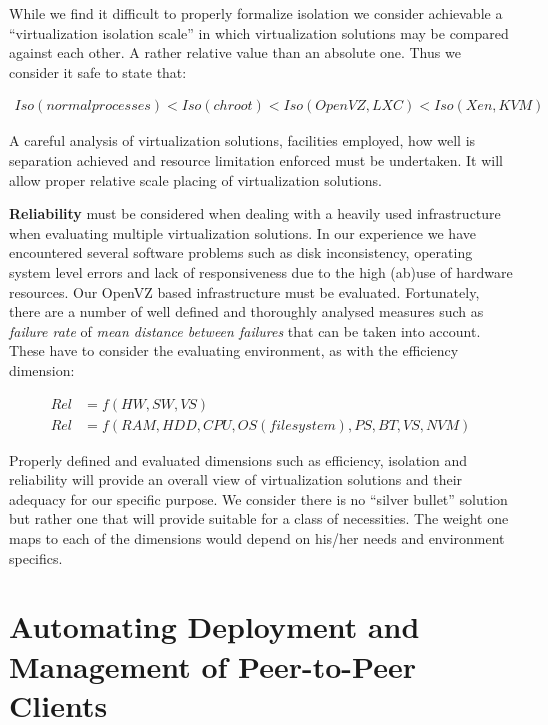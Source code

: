 While we find it difficult to properly formalize isolation we consider
achievable a ``virtualization isolation scale'' in which virtualization
solutions may be compared against each other. A rather relative value than an
absolute one. Thus we consider it safe to state that:

\begin{align}
Iso(normal processes) < Iso(chroot) < Iso(OpenVZ, LXC) < Iso(Xen,KVM)
\end{align}

A careful analysis of virtualization solutions, facilities employed, how well
is separation achieved and resource limitation enforced must be undertaken. It
will allow proper relative scale placing of virtualization solutions.

\textbf{Reliability} must be considered when dealing with a heavily used
infrastructure when evaluating multiple virtualization solutions. In our
experience we have encountered several software problems such as disk
inconsistency, operating system level errors and lack of responsiveness due to
the high (ab)use of hardware resources. Our OpenVZ based infrastructure must
be evaluated. Fortunately, there are a number of well defined and thoroughly
analysed measures such as \textit{failure rate} of \textit{mean distance
between failures} that can be taken into account. These have to consider the
evaluating environment, as with the efficiency dimension:

\begin{align}
Rel & = f(HW, SW, VS)\\
Rel & = f(RAM, HDD, CPU, OS (filesystem), PS, BT, VS, NVM)
\end{align}

Properly defined and evaluated dimensions such as efficiency, isolation and
reliability will provide an overall view of virtualization solutions and their
adequacy for our specific purpose. We consider there is no ``silver bullet''
solution but rather one that will provide suitable for a class of necessities.
The weight one maps to each of the dimensions would depend on his/her needs
and environment specifics.


\section{Automating Deployment and Management of Peer-to-Peer Clients}
\label{sec:virt-infra:auto-deploy}

